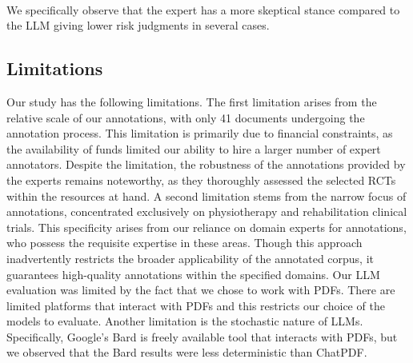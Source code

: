 \documentclass[sn-mathphys,Numbered]{sn-jnl}%
\theoremstyle{thmstyleone}%
\theoremstyle{thmstyletwo}%
\theoremstyle{thmstylethree}%
\begin{document}
~\cite{thorndike2014activity}



We specifically observe that the expert has a more skeptical stance compared to the LLM giving lower risk judgments in several cases.

%
%
%
\subsection{Limitations}
\label{subsec:limits}
%
Our study has the following limitations.
The first limitation arises from the relative scale of our annotations, with only 41 documents undergoing the annotation process.
This limitation is primarily due to financial constraints, as the availability of funds limited our ability to hire a larger number of expert annotators.
Despite the limitation, the robustness of the annotations provided by the experts remains noteworthy, as they thoroughly assessed the selected RCTs within the resources at hand.
A second limitation stems from the narrow focus of annotations, concentrated exclusively on physiotherapy and rehabilitation clinical trials.
This specificity arises from our reliance on domain experts for annotations, who possess the requisite expertise in these areas.
Though this approach inadvertently restricts the broader applicability of the annotated corpus, it guarantees high-quality annotations within the specified domains.
Our LLM evaluation was limited by the fact that we chose to work with PDFs. 
There are limited platforms that interact with PDFs and this restricts our choice of the models to evaluate.
Another limitation is the stochastic nature of LLMs.
Specifically, Google's Bard is freely available tool that interacts with PDFs, but we observed that the Bard results were less deterministic than ChatPDF.
%
%
%
\end{document}
